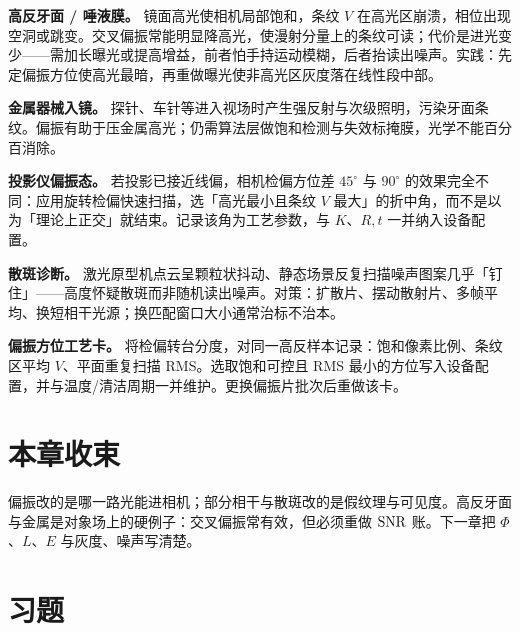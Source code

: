\textbf{高反牙面 / 唾液膜。} 镜面高光使相机局部饱和，条纹 $V$ 在高光区崩溃，相位出现空洞或跳变。交叉偏振常能明显降高光，使漫射分量上的条纹可读；代价是进光变少——需加长曝光或提高增益，前者怕手持运动模糊，后者抬读出噪声。实践：先定偏振方位使高光最暗，再重做曝光使非高光区灰度落在线性段中部。

\textbf{金属器械入镜。} 探针、车针等进入视场时产生强反射与次级照明，污染牙面条纹。偏振有助于压金属高光；仍需算法层做饱和检测与失效标掩膜，光学不能百分百消除。

\textbf{投影仪偏振态。} 若投影已接近线偏，相机检偏方位差 $45^\circ$ 与 $90^\circ$ 的效果完全不同：应用旋转检偏快速扫描，选「高光最小且条纹 $V$ 最大」的折中角，而不是以为「理论上正交」就结束。记录该角为工艺参数，与 $K$、$R,t$ 一并纳入设备配置。

\textbf{散斑诊断。} 激光原型机点云呈颗粒状抖动、静态场景反复扫描噪声图案几乎「钉住」——高度怀疑散斑而非随机读出噪声。对策：扩散片、摆动散射片、多帧平均、换短相干光源；换匹配窗口大小通常治标不治本。


\textbf{偏振方位工艺卡。} 将检偏转台分度，对同一高反样本记录：饱和像素比例、条纹区平均 $V$、平面重复扫描 RMS。选取饱和可控且 RMS 最小的方位写入设备配置，并与温度/清洁周期一并维护。更换偏振片批次后重做该卡。

\section*{本章收束}
偏振改的是哪一路光能进相机；部分相干与散斑改的是假纹理与可见度。高反牙面与金属是对象场上的硬例子：交叉偏振常有效，但必须重做 $\mathrm{SNR}$ 账。下一章把 $\Phi$、$L$、$E$ 与灰度、噪声写清楚。

\section{习题}
\label{sec:ch04-exercises}

